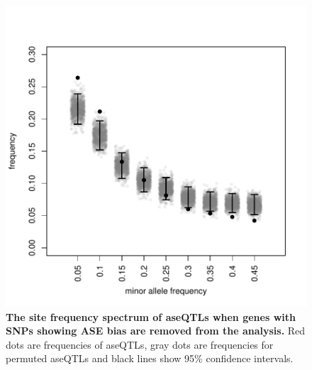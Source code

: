 \begin{figure}[ht]
      \centering
       \includegraphics[width=\linewidth]{Ch3Sim}
    \caption{\textbf{The site frequency spectrum of aseQTLs when genes with SNPs showing ASE bias are removed from the analysis.} Red dots are frequencies of aseQTLs, gray dots are frequencies for permuted aseQTLs and black lines show 95\% confidence intervals. }
    \label{fig:3figS9}
\end{figure}
